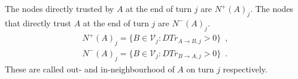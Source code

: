\begin{definition}[Neighbourhood]
  \label{neighbourhood}
  The nodes directly trusted by $A$ at the end of turn $j$ are $N^{+}\left(A\right)_j$. The nodes that directly trust $A$ at
  the end of turn $j$ are $N^{-}\left(A\right)_j$.
    \begin{equation}
    \begin{gathered}
      N^{+}\left(A\right)_j = \{B \in \mathcal{V}_j : DTr_{A \rightarrow B, j} > 0\} \enspace, \\
      N^{-}\left(A\right)_j = \{B \in \mathcal{V}_j : DTr_{B \rightarrow A, j} > 0\} \enspace.
    \end{gathered}
    \end{equation}
    These are called out- and in-neighbourhood of $A$ on turn $j$ respectively.
\end{definition}
